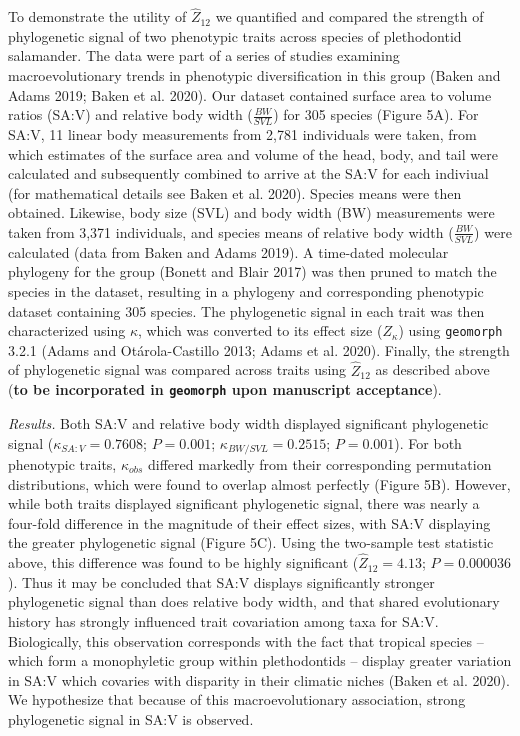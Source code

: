 \documentclass[
]{article}
\begin{document}
To demonstrate the utility of \(\hat{Z}_{12}\) we quantified and
compared the strength of phylogenetic signal of two phenotypic traits
across species of plethodontid salamander. The data were part of a
series of studies examining macroevolutionary trends in phenotypic
diversification in this group (Baken and Adams 2019; Baken et al. 2020).
Our dataset contained surface area to volume ratios (SA:V) and relative
body width (\(\frac{BW}{SVL}\)) for 305 species (Figure 5A). For SA:V,
11 linear body measurements from 2,781 individuals were taken, from
which estimates of the surface area and volume of the head, body, and
tail were calculated and subsequently combined to arrive at the SA:V for
each indiviual (for mathematical details see Baken et al. 2020). Species
means were then obtained. Likewise, body size (SVL) and body width (BW)
measurements were taken from 3,371 individuals, and species means of
relative body width (\(\frac{BW}{SVL}\)) were calculated (data from
Baken and Adams 2019). A time-dated molecular phylogeny for the group
(Bonett and Blair 2017) was then pruned to match the species in the
dataset, resulting in a phylogeny and corresponding phenotypic dataset
containing 305 species. The phylogenetic signal in each trait was then
characterized using \(\kappa\), which was converted to its effect size
(\(Z_\kappa\)) using \texttt{geomorph} 3.2.1 (Adams and Otárola-Castillo
2013; Adams et al. 2020). Finally, the strength of phylogenetic signal
was compared across traits using \(\hat{Z}_{12}\) as described above
(\textbf{to be incorporated in \texttt{geomorph} upon manuscript
acceptance}). \hfill\break

\emph{Results.} Both SA:V and relative body width displayed significant
phylogenetic signal (\(\kappa_{SA:V}=0.7608\); \(P=0.001\);
\(\kappa_{BW/SVL}=0.2515\); \(P=0.001\)). For both phenotypic traits,
\(\kappa_{obs}\) differed markedly from their corresponding permutation
distributions, which were found to overlap almost perfectly (Figure 5B).
However, while both traits displayed significant phylogenetic signal,
there was nearly a four-fold difference in the magnitude of their effect
sizes, with SA:V displaying the greater phylogenetic signal (Figure 5C).
Using the two-sample test statistic above, this difference was found to
be highly significant (\(\hat{Z}_{12}=4.13\); \(P=0.000036\)). Thus it
may be concluded that SA:V displays significantly stronger phylogenetic
signal than does relative body width, and that shared evolutionary
history has strongly influenced trait covariation among taxa for SA:V.
Biologically, this observation corresponds with the fact that tropical
species -- which form a monophyletic group within plethodontids --
display greater variation in SA:V which covaries with disparity in their
climatic niches (Baken et al. 2020). We hypothesize that because of this
macroevolutionary association, strong phylogenetic signal in SA:V is
observed.
\end{document}

